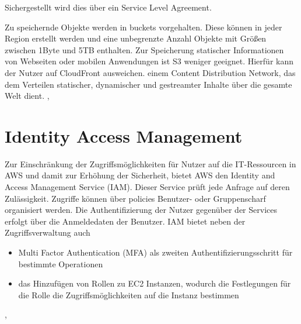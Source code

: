 Sichergestellt wird dies über ein Service Level Agreement. \cite{vliet:programmingec2}

Zu speichernde Objekte werden in buckets vorgehalten. Diese können in jeder Region erstellt werden und eine unbegrenzte Anzahl Objekte mit Größen zwischen 1Byte und 5TB enthalten. Zur Speicherung statischer Informationen von Webseiten oder mobilen Anwendungen ist S3 weniger geeignet. Hierfür kann der Nutzer auf CloudFront ausweichen. einem Content Distribution Network, das dem Verteilen statischer, dynamischer und gestreamter Inhalte über die gesamte Welt dient.
\cite{vliet:resilience}, \cite{aws:s3}

\section{Identity Access Management}
\label{sec:iam}
Zur Einschränkung der Zugriffsmöglichkeiten für Nutzer auf die IT-Ressourcen in AWS und damit zur Erhöhung der Sicherheit, bietet AWS den Identity and Access Management Service (IAM). Dieser Service prüft jede Anfrage auf deren Zulässigkeit. Zugriffe können über policies Benutzer- oder Gruppenscharf organisiert werden. Die Authentifizierung der Nutzer gegenüber der Services erfolgt über die Anmeldedaten der Benutzer. IAM bietet neben der Zugriffsverwaltung auch
\begin{itemize}
  \item Multi Factor Authentication (MFA) als zweiten Authentifizierungsschritt für bestimmte Operationen
  \item das Hinzufügen von Rollen zu EC2 Instanzen, wodurch die Festlegungen für die Rolle die Zugriffsmöglichkeiten auf die Instanz bestimmen
\end{itemize}
\cite{vliet:resilience}, \cite{wittig:awsinaction}




